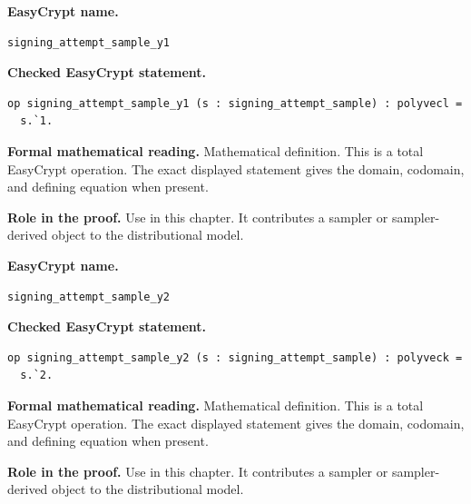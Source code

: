 \begin{formaldefinition}
\noindent\textbf{EasyCrypt name.}
\begin{lstlisting}[language=EasyCrypt,basicstyle=\ttfamily\scriptsize]
signing_attempt_sample_y1
\end{lstlisting}
\noindent\textbf{Checked EasyCrypt statement.}
\begin{lstlisting}[language=EasyCrypt,basicstyle=\ttfamily\scriptsize]
op signing_attempt_sample_y1 (s : signing_attempt_sample) : polyvecl =
  s.`1.
\end{lstlisting}
\noindent\textbf{Formal mathematical reading.}
Mathematical definition. This is a total EasyCrypt operation.  The exact displayed statement gives the domain, codomain, and defining equation when present.

\noindent\textbf{Role in the proof.}
Use in this chapter. It contributes a sampler or sampler-derived object to the distributional model.

\end{formaldefinition}

\begin{formaldefinition}
\noindent\textbf{EasyCrypt name.}
\begin{lstlisting}[language=EasyCrypt,basicstyle=\ttfamily\scriptsize]
signing_attempt_sample_y2
\end{lstlisting}
\noindent\textbf{Checked EasyCrypt statement.}
\begin{lstlisting}[language=EasyCrypt,basicstyle=\ttfamily\scriptsize]
op signing_attempt_sample_y2 (s : signing_attempt_sample) : polyveck =
  s.`2.
\end{lstlisting}
\noindent\textbf{Formal mathematical reading.}
Mathematical definition. This is a total EasyCrypt operation.  The exact displayed statement gives the domain, codomain, and defining equation when present.

\noindent\textbf{Role in the proof.}
Use in this chapter. It contributes a sampler or sampler-derived object to the distributional model.

\end{formaldefinition}

